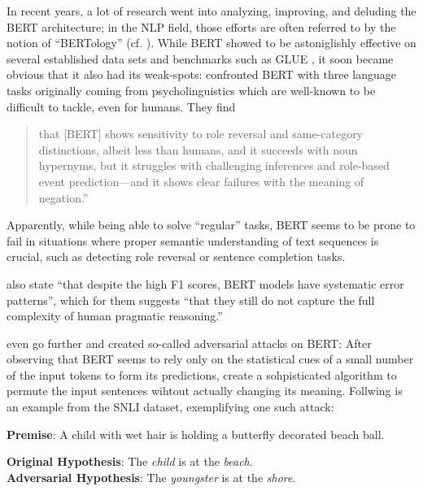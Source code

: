 In recent years, a lot of research went into analyzing, improving, and deluding the BERT architecture;
in the NLP field, those efforts are often referred to by the notion of ``BERTology'' (cf. \cite{rogers2020primer}).
While BERT showed to be astoniglishly effective on several established data sets and benchmarks such as GLUE \citep{wang2018glue},
it soon became obvious that it also {\color{red} had} its weak-spots: \citeauthor{ettinger2020bert} confronted
BERT with three language tasks originally coming from psycholinguistics which are well-known to be difficult
to tackle, even for humans. They find

\begin{quote}
that [BERT] shows sensitivity to role reversal and
same-category distinctions, albeit less than humans, and it succeeds with noun hypernyms,
but it struggles with challenging inferences and role-based event prediction—and it shows
clear failures with the meaning of negation.'' \citep[p.~46]{ettinger2020bert}
\end{quote}

Apparently, while being able to solve ``regular'' tasks, BERT seems to be prone to fail
in situations where proper semantic understanding of text sequences is crucial, such as
detecting role reversal or sentence completion tasks.

\cite{jiang2019evaluating} also state ``that despite the high F1 scores, BERT models have
systematic error patterns'', which for them suggests ``that they still do not capture the
full complexity of human pragmatic reasoning.''

\cite{jin2020bert}even go further and created so-called adversarial attacks on BERT:
After observing that BERT seems to rely only on the statistical cues of a small number of the input tokens to
form its predictions, \citeauthor{jin2020bert} create a sohpisticated algorithm to permute
the input sentences wihtout actually changing its meaning. Follwing is an example from the
SNLI \citep{bowman2015snli} dataset, exemplifying one such attack:

\begin{examples}
  \item \textbf{Premise}: A child with wet hair is holding a butterfly decorated beach ball.

        \textbf{Original Hypothesis}: The \emph{child} is at the \emph{beach}.\\
        \textbf{Adversarial Hypothesis}: The \emph{youngster} is at the \emph{shore}.
\end{examples}

